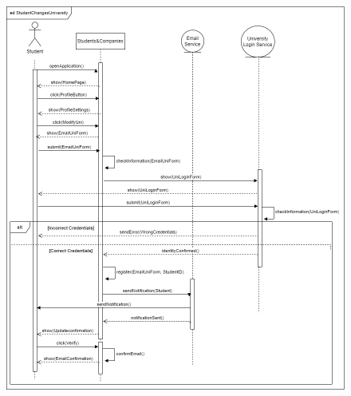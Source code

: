 \documentclass[a4paper,12pt]{article}
\begin{document}
\begin{figure}[H]
    \centering
    \includegraphics[scale = 0.45]{figures/UseCasesSD/StudentChangesUniversitySD.drawio (1).png}
\end{figure}
\end{document}
